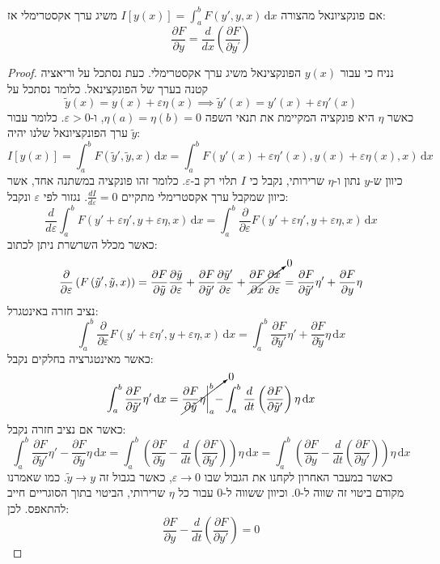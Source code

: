 \documentclass{tstextbook}
\begin{document}
\begin{theorem}
אם פונקציונאל מהצורה \(I[y(x)]=\int_{a}^b F(y',y,x) \, \mathrm{d}x\) משיג ערך אקסטרימלי אז:
$${\frac{\partial F}{\partial y}}={\frac{d}{d x}}\left({\frac{\partial F}{\partial y^{\prime}}}\right)$$

\end{theorem}
\begin{proof}
נניח כי עבור \(y(x)\) הפונקצינאל משיג ערך אקסטרימלי. כעת נסתכל על וריאציה קטנה בערך של הפונקצינאל. כלומר נסתכל על
$$\tilde{y}(x)=y(x)+\varepsilon\eta(x)\implies \tilde{y}'(x)=y'(x)+\varepsilon \eta'(x)$$
כאשר \(\eta\) היא פונקציה המקיימת את תנאי השפה \(\eta(a)=\eta (b)=0\), ו-\(\varepsilon>0\). כלומר עבור \(\tilde{y}\) ערך הפונקציונאל שלנו יהיה:
$$I[y(x)]=\int_{a}^b F\left( \tilde{y}',\tilde{y},x \right) \, \mathrm{d}x=\int_{a}^b F\left( y'(x)+\varepsilon \eta'(x),y(x)+\varepsilon\eta(x),x \right) \, \mathrm{d}x $$
כיוון ש-\(y\) נתון ו-\(\eta\) שרירותי, נקבל כי \(I\) תלוי רק ב-\(\varepsilon\). כלומר זהו פונקציה במשתנה אחד, אשר כיוון שמקבל ערך אקסטרימלי מתקיים \(\frac{d I}{d \varepsilon}=0\). נגזור לפי \(\varepsilon\) ונקבל:
$$\frac{d }{d \varepsilon}\int_{a}^b F\left( y'+\varepsilon \eta',y+\varepsilon\eta,x \right) \, \mathrm{d}x=\int_{a}^b \frac{\partial }{\partial \varepsilon}F\left( y'+\varepsilon \eta',y+\varepsilon\eta,x \right) \, \mathrm{d}x $$
כאשר מכלל השרשרת ניתן לכתוב:
$$\frac{\partial }{\partial \varepsilon}\left( F\left( \tilde{y}',\tilde{y},x \right) \right)=\frac{\partial F}{\partial \tilde{y}}\frac{\partial \tilde{y}}{\partial \varepsilon}+\frac{\partial F}{\partial \tilde{y}'}\frac{\partial \tilde{y}'}{\partial \varepsilon}+\cancelto{ 0 }{ \frac{\partial F}{\partial x}\frac{\partial x}{\partial \varepsilon} }=\frac{\partial F}{\partial \tilde{y}'}\eta'+\frac{\partial F}{\partial y}\eta$$
נציב חזרה באינטגרל:
$$\int_{a}^b \frac{\partial }{\partial \varepsilon}F\left( y'+\varepsilon \eta',y+\varepsilon\eta,x \right) \, \mathrm{d}x=\int _{a}^b \frac{\partial F}{\partial \tilde{y}'}\eta'+\frac{\partial F}{\partial \tilde{y}}\eta \, \mathrm{d}x $$
כאשר מאינטגרציה בחלקים נקבל:
$$\int _{a}^b \frac{\partial F}{\partial \tilde{y}'}\eta' \, \mathrm{d}x =\cancelto{ 0 }{ \frac{\partial F}{\partial \tilde{y}}\eta\bigg|_{a}^b- }\int_{a}^b \frac{d}{dt}\left( \frac{\partial F}{\partial \tilde{y}'} \right)\eta  \, \mathrm{d}x $$
כאשר אם נציב חזרה נקבל:
$$\int _{a}^b \frac{\partial F}{\partial \tilde{y}'}\eta'-\frac{\partial F}{\partial \tilde{y}}\eta \, \mathrm{d}x=\int_{a}^b \left(\frac{\partial F}{\partial \tilde{y}}-\frac{d}{dt}\left( \frac{\partial F}{\partial \tilde{y}'} \right) \right)\eta  \, \mathrm{d}x=\int_{a}^b \left(\frac{\partial F}{\partial y}-\frac{d}{dt}\left( \frac{\partial F}{\partial y'} \right) \right)\eta  \, \mathrm{d}x $$
כאשר במעבר האחרון לקחנו את הגבול שבו \(\varepsilon\to 0\), כאשר בגבול זה \(\tilde{y}\to y\). כמו שאמרנו מקודם ביטוי זה שווה ל-\(0\). וכיוון ששווה ל-\(0\) עבור כל \(\eta\) שרירותי, הביטוי בתוך הסוגריים חייב להתאפס. לכן:
$$\frac{\partial F}{\partial y}-\frac{d}{dt}\left( \frac{\partial F}{\partial y'} \right) =0$$

\end{proof}
\end{document}

